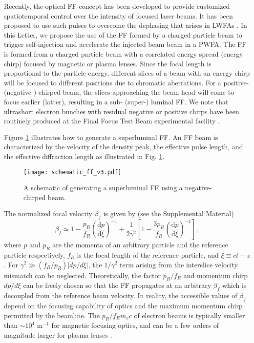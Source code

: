 \documentclass[
aps,
prl,
reprint,
superscriptaddress,
amsmath,
amssymb,
showpacs
]{revtex4-2}
\newcommand{\DD}[2]{\frac{\text{d}#1}{\text{d}#2}}
\begin{document}
Recently, the optical FF concept \cite{Froula2018,Palastro2018,Kondakci2019,Palastro2020,Yessenov2020,Caizergues2020} has been developed to provide customized spatiotemporal control over the intensity of focused laser beams. It has been proposed to use such pulses to overcome the dephasing that arises in LWFAs \cite{Palastro2020,Caizergues2020}.
In this Letter, we propose the use of the FF formed by a charged particle beam to trigger self-injection and accelerate the injected beam beam in a PWFA. The FF is formed from a charged particle beam with a correlated energy spread (energy chirp) focused by magnetic or plasma lenses. Since the focal length is proportional to the particle energy, different slices of a beam with an energy chirp will be focused to different positions due to chromatic aberrations. For a positive- (negative-) chirped beam, the slices approaching the beam head will come to focus earlier (latter), resulting in a sub- (super-) luminal FF. We note that ultrashort electron bunches with residual negative or positive chirps have been routinely produced at the Final Focus Test Beam experimental facility \cite{Hogan2005,Litos2014}.

Figure \ref{fig:schematic_ff} illustrates how to generate a superluminal FF.
An FF beam is characterized by the velocity of the density peak, the effective pulse length, and the effective diffraction length as illustrated in Fig. \ref{fig:schematic_ff}.

\begin{figure}[htbp]
\texttt{[image: schematic\_ff\_v3.pdf]}
\caption{
A schematic of generating a superluminal FF using a negative-chirped beam.
}
\label{fig:schematic_ff}
\end{figure} 

The normalized focal velocity $\beta_f$ is given by (see the Supplemental Material)
\begin{equation}
\label{eq:focal_velocity}
  \beta_f \simeq 1 - \frac{p_R}{f_R}\left(\DD{p}{\xi}\right)^{-1} 
  + \frac{1}{2\gamma^2}\left[1-\frac{3p_R}{f_R}\left(\DD{p}{\xi}\right)^{-1}\right],
\end{equation}
where $p$ and $p_R$ are the momenta of an arbitrary particle and the reference particle respectively, $f_R$ is the focal length of the reference particle, and $\xi\equiv ct-z$. For $\gamma^2\gg(f_R/p_R)|dp/d\xi|$, the $1/\gamma^2$ term arising from the interslice velocity mismatch can be neglected. Theoretically, the factor $p_R/f_R$ and momentum chirp $dp/d\xi$ can be freely chosen so that the FF propagates at an arbitrary $\beta_f$ which is decoupled from the reference beam velocity. In reality, the accessible values of $\beta_f$ depend on the focusing capability of optics and the maximum momentum chirp permitted by the beamline. The $p_R/f_R m_ec$ of electron beams is typically smaller than $\sim10^4$ m$^{-1}$ for magnetic focusing optics, and can be a few orders of magnitude larger for plasma lenses \cite{Su1990,Pompili2018}.
\end{document}
